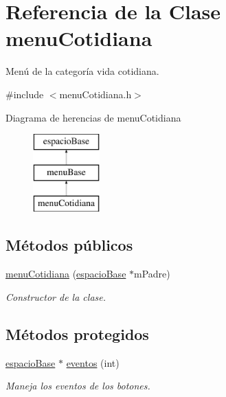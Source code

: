 \hypertarget{classmenu_cotidiana}{}\section{Referencia de la Clase menu\+Cotidiana}
\label{classmenu_cotidiana}


Menú de la categoría vida cotidiana.  




{\ttfamily \#include $<$menu\+Cotidiana.\+h$>$}

Diagrama de herencias de menu\+Cotidiana\begin{figure}[H]
\begin{center}
\leavevmode
\includegraphics[height=3.000000cm]{classmenu_cotidiana}
\end{center}
\end{figure}
\subsection*{Métodos públicos}
\begin{DoxyCompactItemize}
\item 
\hyperlink{classmenu_cotidiana_a7af3789d7f16fec560bf7c5723b38581}{menu\+Cotidiana} (\hyperlink{classespacio_base}{espacio\+Base} $\ast$m\+Padre)
\begin{DoxyCompactList}\small\item\em Constructor de la clase. \end{DoxyCompactList}\end{DoxyCompactItemize}
\subsection*{Métodos protegidos}
\begin{DoxyCompactItemize}
\item 
\hyperlink{classespacio_base}{espacio\+Base} $\ast$ \hyperlink{classmenu_cotidiana_a5bc0b717e3cf19d4daa8bb73f3669f3a}{eventos} (int)
\begin{DoxyCompactList}\small\item\em Maneja los eventos de los botones. \end{DoxyCompactList}\end{DoxyCompactItemize}

